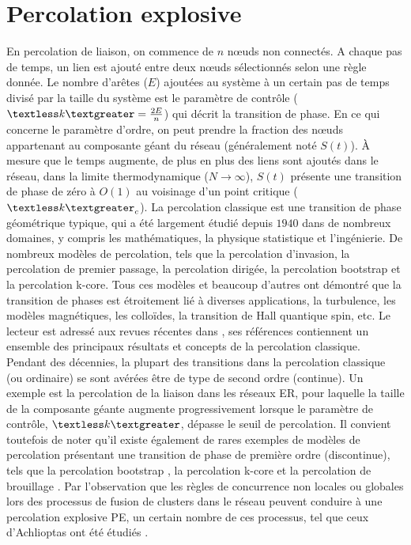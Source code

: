 \section{Percolation explosive}
En percolation de liaison, on commence de $n$ nœuds non connectés. A chaque pas de temps, un lien est ajouté entre deux nœuds sélectionnés selon une règle donnée. Le nombre d'arêtes ($E$) ajoutées au système à un certain pas de temps divisé par la taille du système est le paramètre de contrôle ($\km=\frac{2E}{n}$) qui décrit la transition de phase. En ce qui concerne le paramètre d'ordre, on peut prendre la fraction des nœuds appartenant au composante géant du réseau (généralement noté $S(t)$). À mesure que le temps augmente, de plus en plus des liens sont ajoutés dans le réseau, dans la limite thermodynamique ($N\longrightarrow \infty$), $S(t)$ présente une transition de phase de zéro à $O(1)$ au voisinage d'un point critique ($\km_c$). La percolation classique est une transition de phase géométrique typique, qui a été largement étudié depuis $1940$ dans de nombreux domaines, y compris les mathématiques, la physique statistique et l'ingénierie. De nombreux modèles de percolation, tels que la percolation d'invasion, la percolation de premier passage, la percolation dirigée, la percolation bootstrap et la percolation k-core. Tous ces modèles et beaucoup d'autres
ont démontré que la transition de phases est étroitement lié à diverses applications, la turbulence, les modèles magnétiques, les colloïdes, la transition de Hall quantique spin, etc. Le lecteur est adressé aux revues récentes dans \cite{Boccaletti-al2016,Souza-Nagler2015,Araujo-al2014}, ses références contiennent un ensemble des principaux résultats et concepts de la percolation classique.\\

Pendant des décennies, la plupart des transitions dans la percolation classique (ou ordinaire) se sont avérées être de type de second ordre (continue). Un exemple est la percolation de la liaison dans les réseaux ER, pour laquelle la taille de la composante géante augmente progressivement lorsque le paramètre de contrôle, $\km$, dépasse le seuil de percolation. Il convient toutefois de noter qu'il existe également de rares exemples de modèles de percolation présentant une transition de phase de première ordre (discontinue), tels que la percolation bootstrap \cite{Adler1991}, la percolation k-core \cite{Dorogovtsev2-2006} et la percolation de brouillage \cite{Echenique-al2005}. Par l'observation que les règles de concurrence non locales ou globales lors des processus de fusion de clusters dans le réseau peuvent conduire à une percolation explosive PE, un certain nombre de ces processus, tel que ceux d'Achlioptas ont été étudiés \cite{Costa-al2010,Costa-al2015,Cho-Kahng2011}.

